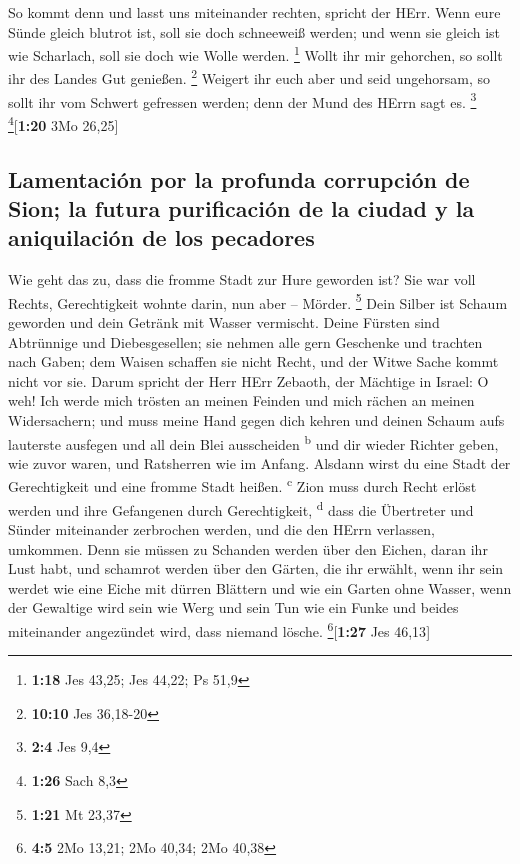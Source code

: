  So kommt denn und lasst uns miteinander rechten, spricht
der HErr. Wenn eure Sünde gleich blutrot ist, soll sie doch schneeweiß
werden; und wenn sie gleich ist wie Scharlach, soll sie doch wie Wolle
werden. \footnote{\textbf{1:18} Jes 43,25; Jes 44,22; Ps 51,9}
 Wollt ihr mir gehorchen, so sollt ihr des Landes Gut
genießen. \footnote{\textbf{10:10} Jes 36,18-20}  Weigert
ihr euch aber und seid ungehorsam, so sollt ihr vom Schwert gefressen
werden; denn der Mund des HErrn sagt es. \footnote{\textbf{2:4} Jes 9,4}
\footnote{\textbf{1:26} Sach 8,3}{[}\textbf{1:20} 3Mo 26,25{]}

\hypertarget{lamentaciuxf3n-por-la-profunda-corrupciuxf3n-de-sion-la-futura-purificaciuxf3n-de-la-ciudad-y-la-aniquilaciuxf3n-de-los-pecadores}{%
\subsection{Lamentación por la profunda corrupción de Sion; la futura
purificación de la ciudad y la aniquilación de los
pecadores}\label{lamentaciuxf3n-por-la-profunda-corrupciuxf3n-de-sion-la-futura-purificaciuxf3n-de-la-ciudad-y-la-aniquilaciuxf3n-de-los-pecadores}}

 Wie geht das zu, dass die fromme Stadt zur Hure geworden
ist? Sie war voll Rechts, Gerechtigkeit wohnte darin, nun aber --
Mörder. \footnote{\textbf{1:21} Mt 23,37}  Dein Silber
ist Schaum geworden und dein Getränk mit Wasser vermischt.
 Deine Fürsten sind Abtrünnige und Diebesgesellen; sie
nehmen alle gern Geschenke und trachten nach Gaben; dem Waisen schaffen
sie nicht Recht, und der Witwe Sache kommt nicht vor sie.
 Darum spricht der Herr HErr Zebaoth, der Mächtige in
Israel: O weh! Ich werde mich trösten an meinen Feinden und mich rächen
an meinen Widersachern;  und muss meine Hand gegen dich
kehren und deinen Schaum aufs lauterste ausfegen und all dein Blei
ausscheiden \textsuperscript{b}  und dir wieder Richter
geben, wie zuvor waren, und Ratsherren wie im Anfang. Alsdann wirst du
eine Stadt der Gerechtigkeit und eine fromme Stadt heißen.
\textsuperscript{c}  Zion muss durch Recht erlöst werden
und ihre Gefangenen durch Gerechtigkeit, \textsuperscript{d}
 dass die Übertreter und Sünder miteinander zerbrochen
werden, und die den HErrn verlassen, umkommen.  Denn sie
müssen zu Schanden werden über den Eichen, daran ihr Lust habt, und
schamrot werden über den Gärten, die ihr erwählt,  wenn
ihr sein werdet wie eine Eiche mit dürren Blättern und wie ein Garten
ohne Wasser,  wenn der Gewaltige wird sein wie Werg und
sein Tun wie ein Funke und beides miteinander angezündet wird, dass
niemand lösche. \footnote{\textbf{4:5} 2Mo 13,21; 2Mo 40,34; 2Mo 40,38}{[}\textbf{1:27}
Jes 46,13{]}

